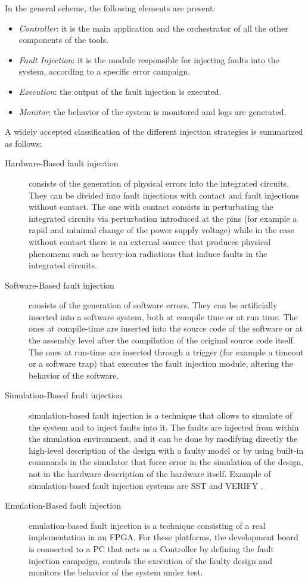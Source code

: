 In the general scheme, the following elements are present:

\begin{itemize}
    \item \textit{Controller}: it is the main application and the orchestrator of all the other components of the tools.
    \item \textit{Fault Injection}: it is the module responsible for injecting faults into the system, according to a specific error campaign.
    \item \textit{Execution}: the output of the fault injection is executed.
    \item \textit{Monitor}: the behavior of the system is monitored and logs are generated.
\end{itemize}

A widely accepted classification of the different injection strategies is summarized as follows:

\begin{description}
    \item[Hardware-Based fault injection] consists of the generation of physical errors into the integrated circuits. They can be divided into fault injections with contact and fault injections without contact. The one with contact consists in perturbating the integrated circuits via perturbation introduced at the pins (for example a rapid and minimal change of the power supply voltage) while in the case without contact there is an external source that produces physical phenomena such as heavy-ion radiations that induce faults in the integrated circuits.
    \item[Software-Based fault injection] consists of the generation of software errors. They can be artificially inserted into a software system, both at compile time or at run time. The ones at compile-time \cite{fithesisdrizz} are inserted into the source code of the software or at the assembly level after the compilation of the original source code itself. The ones at run-time are inserted through a trigger (for example a timeout or a software trap) that executes the fault injection module, altering the behavior of the software.
    \item[Simulation-Based fault injection] simulation-based fault injection is a technique that allows to simulate of the system and to inject faults into it. The faults are injected from within the simulation environment, and it can be done by modifying directly the high-level description of the design with a faulty model or by using built-in commands in the simulator that force error in the simulation of the design, not in the hardware description of the hardware itself. Example of simulation-based fault injection systems are SST \cite{4375147} and VERIFY \cite{614074}.
    \item[Emulation-Based fault injection] emulation-based fault injection is a technique consisting of a real implementation in an FPGA. For these platforms, the development board is connected to a PC that acts as a Controller by defining the fault injection campaign, controls the execution of the faulty design and monitors the behavior of the system under test.
\end{description}

